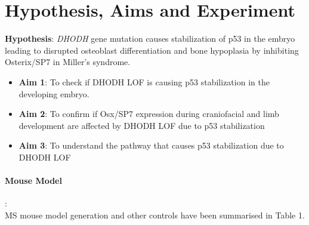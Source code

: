 \documentclass[12pt]{article}
\begin{document}
\section{Hypothesis, Aims and Experiment}	
\textbf{Hypothesis}: \textit{DHODH} gene mutation causes stabilization of p53 in the embryo leading to disrupted osteoblast differentiation and bone hypoplasia by inhibiting Osterix/SP7 in Miller's syndrome.
\begin{itemize}
	\item {\textbf{Aim 1}}: To check if DHODH LOF is causing p53 stabilization in the developing embryo.
	\item {\textbf{Aim 2}}: To confirm if Osx/SP7 expression during craniofacial and limb development are affected by DHODH LOF due to p53 stabilization
	\item {\textbf{Aim 3}}: To understand the pathway that causes p53 stabilization due to DHODH LOF 
\end{itemize}


\paragraph{Mouse Model}:
\\ 
MS mouse model generation and other controls have been summarised in Table 1. 
\end{document}
